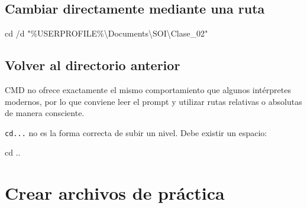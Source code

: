 \documentclass[
  spanish,
  letterpaper,
]{scrbook}
\newenvironment{Shaded}{\begin{snugshade}}{\end{snugshade}}
\newcommand{\AttributeTok}[1]{\textcolor[rgb]{0.40,0.45,0.13}{#1}}
\newcommand{\BuiltInTok}[1]{\textcolor[rgb]{0.00,0.23,0.31}{#1}}
\newcommand{\NormalTok}[1]{\textcolor[rgb]{0.00,0.23,0.31}{#1}}
\newcommand{\PreprocessorTok}[1]{\textcolor[rgb]{0.68,0.00,0.00}{#1}}
\newcommand{\StringTok}[1]{\textcolor[rgb]{0.13,0.47,0.30}{#1}}
\newcommand{\VariableTok}[1]{\textcolor[rgb]{0.07,0.07,0.07}{#1}}
\begin{document}
\section{Cambiar directamente mediante una
ruta}\label{cambiar-directamente-mediante-una-ruta}

\begin{Shaded}
\begin{Highlighting}[]
\BuiltInTok{cd} \AttributeTok{/d} \StringTok{"}\PreprocessorTok{\%}\VariableTok{USERPROFILE}\PreprocessorTok{\%}\StringTok{\textbackslash{}Documents\textbackslash{}SOI\textbackslash{}Clase\_02"}
\end{Highlighting}
\end{Shaded}

\section{Volver al directorio
anterior}\label{volver-al-directorio-anterior}

CMD no ofrece exactamente el mismo comportamiento que algunos
intérpretes modernos, por lo que conviene leer el prompt y utilizar
rutas relativas o absolutas de manera consciente.

\begin{tcolorbox}[enhanced jigsaw, arc=.35mm, bottomrule=.15mm, bottomtitle=1mm, breakable, colback=white, colbacktitle=quarto-callout-warning-color!10!white, colframe=quarto-callout-warning-color-frame, coltitle=black, left=2mm, leftrule=.75mm, opacityback=0, opacitybacktitle=0.6, rightrule=.15mm, title=\textcolor{quarto-callout-warning-color}{\faExclamationTriangle}\hspace{0.5em}{Error común}, titlerule=0mm, toprule=.15mm, toptitle=1mm]

\texttt{cd...} no es la forma correcta de subir un nivel. Debe existir
un espacio:

\begin{Shaded}
\begin{Highlighting}[]
\BuiltInTok{cd}\NormalTok{ ..}
\end{Highlighting}
\end{Shaded}

\end{tcolorbox}


\chapter{Crear archivos de
práctica}\label{crear-archivos-de-pruxe1ctica}
\end{document}
